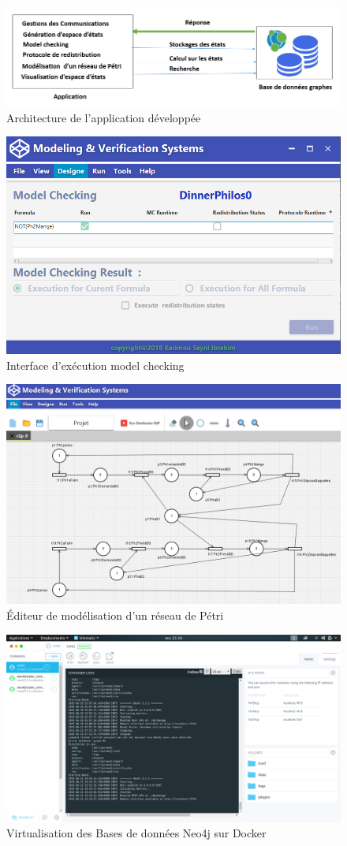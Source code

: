\begin{figure} [h]
	\centering
	\includegraphics[width=0.7\linewidth]{img/architecture}
	\caption{Architecture de l'application développée}
	\label{fig:architecture}
\end{figure}
\begin{figure} [h]
	\centering
	\includegraphics[width=0.7\linewidth]{img/mcapp}
	\caption{Interface d'exécution model checking}
	\label{mc}
\end{figure}
\begin{figure}  
	\centering
	\includegraphics[width=0.7\linewidth]{img/apppetrinet}
	\caption{Éditeur de modélisation d'un réseau de Pétri} \label{apppetrinet}
	\label{fig:apppetrinet}
\end{figure}
\begin{figure} 
	\centering
	\includegraphics[width=0.7\linewidth]{img/clusterdocker}
	\caption{Virtualisation des Bases de données Neo4j sur Docker}
	\label{fig:clusterdocker}
\end{figure}
